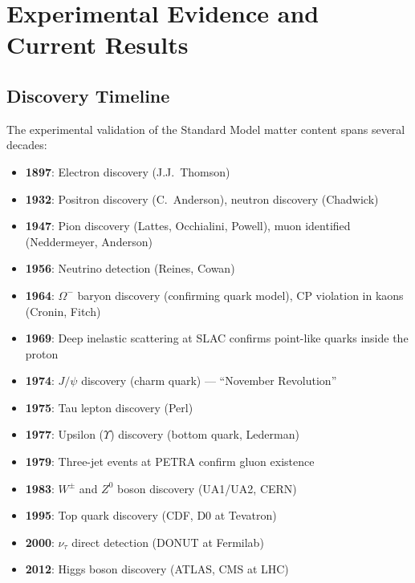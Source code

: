 \documentclass[12pt]{article}
\theoremstyle{definition}
\theoremstyle{remark}
\begin{document}
\section{Experimental Evidence and Current Results}
\label{sec:experimental}

\subsection{Discovery Timeline}

The experimental validation of the Standard Model matter content spans several decades:

\begin{itemize}
    \item \textbf{1897}: Electron discovery (J.J.\ Thomson)
    \item \textbf{1932}: Positron discovery (C.\ Anderson), neutron discovery (Chadwick)
    \item \textbf{1947}: Pion discovery (Lattes, Occhialini, Powell), muon identified (Neddermeyer, Anderson)
    \item \textbf{1956}: Neutrino detection (Reines, Cowan)
    \item \textbf{1964}: $\Omega^-$ baryon discovery (confirming quark model), CP violation in kaons (Cronin, Fitch)
    \item \textbf{1969}: Deep inelastic scattering at SLAC confirms point-like quarks inside the proton
    \item \textbf{1974}: $J/\psi$ discovery (charm quark) --- ``November Revolution''
    \item \textbf{1975}: Tau lepton discovery (Perl)
    \item \textbf{1977}: Upsilon ($\Upsilon$) discovery (bottom quark, Lederman)
    \item \textbf{1979}: Three-jet events at PETRA confirm gluon existence
    \item \textbf{1983}: $W^\pm$ and $Z^0$ boson discovery (UA1/UA2, CERN)
    \item \textbf{1995}: Top quark discovery (CDF, D0 at Tevatron)
    \item \textbf{2000}: $\nu_\tau$ direct detection (DONUT at Fermilab)
    \item \textbf{2012}: Higgs boson discovery (ATLAS, CMS at LHC)
\end{itemize}
\end{document}
